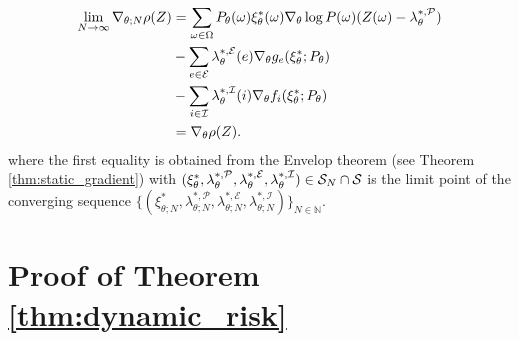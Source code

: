 \begin{equation*}
\begin{split}
  \lim_{N\to\infty}\nabla_{\theta;N}{\rho(Z)}  &=  \sum_{\omega\in\Omega} P_{\theta}(\omega) \xi^*_{\theta}(\omega) \nabla_{\theta} \log P(\omega) (Z(\omega) - \lambda^{*,\mathcal P}_{\theta}) \\
    & - \sum_{e\in\mathcal E} \lambda^{*,\mathcal E}_{\theta}(e) \nabla_{\theta}{g_e(\xi^*_{\theta};P_{\theta})}\\
    & -\sum_{i\in\mathcal I} \lambda^{*,\mathcal I}_{\theta}(i) \nabla_{\theta}{f_i(\xi^*_{\theta};P_{\theta})} \\
    &= \nabla_{\theta}{\rho(Z)}.
\end{split}
\end{equation*}
where the first equality is obtained from the Envelop theorem (see Theorem \ref{thm:static_gradient}) with $(\xi^*_{\theta},\lambda^{*,\mathcal P}_{\theta},\lambda^{*,\mathcal E}_{\theta},\lambda^{*,\mathcal I}_{\theta})\in \mathcal S_{N}\cap\mathcal S$ is the limit point of the converging sequence $\{(\xi^*_{\theta;N},\lambda^{*,\mathcal P}_{\theta;N},\lambda^{*,\mathcal E}_{\theta;N},\lambda^{*,\mathcal I}_{\theta;N})\}_{N\in\mathbb N}$.

\section{Proof of Theorem \ref{thm:dynamic_risk}}

